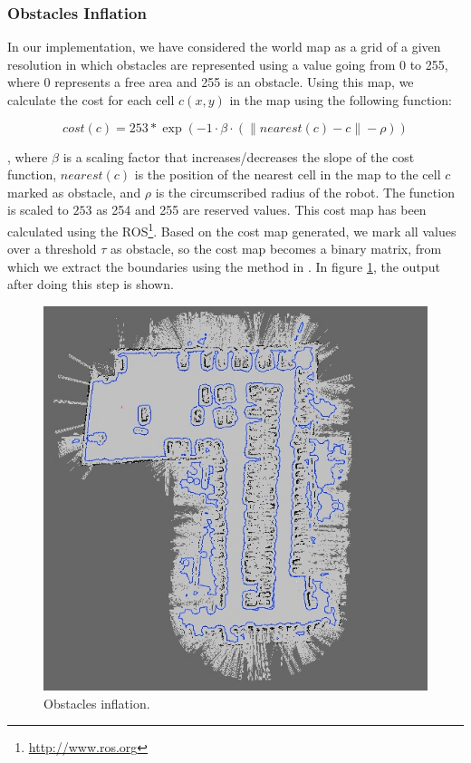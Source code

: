 \subsubsection{Obstacles Inflation}\label{ch:chapter06_01_01_01}

In our implementation, we have considered the world map as a grid of a given resolution in which obstacles are represented using a value going from 0 to 255, where 0 represents a free area and 255 is an obstacle. Using this map, we calculate the cost for each cell $c(x,y)$ in the map using the following function:

\begin{equation}\label{eq:cp06_cell_cost}
 cost(c) = 253 * \exp( -1 \cdot \beta \cdot (\| nearest(c) - c\| - \rho) )
\end{equation}

, where $\beta$ is a scaling factor that increases/decreases the slope of the cost function, $nearest(c)$ is the position of the nearest cell in the map to the cell $c$ marked as obstacle, and $\rho$ is the circumscribed radius of the robot. The function is scaled to $253$ as 254 and 255 are reserved values. This cost map has been calculated using the \acf{ROS}\footnote{\url{http://www.ros.org}}. Based on the cost map generated, we mark all values over a threshold $\tau$ as obstacle, so the cost map becomes a binary matrix, from which we extract the boundaries using the method in \cite{suzuki1985topological}. In figure \ref{fig:cp06_obst_inflation}, the output after doing this step is shown.

\begin{figure}[h!]
  \centering
  \includegraphics[width=\textwidth, trim=0 0 0 0,clip]{figure1}
  \caption{Obstacles inflation.}
  \label{fig:cp06_obst_inflation}
\end{figure}    

